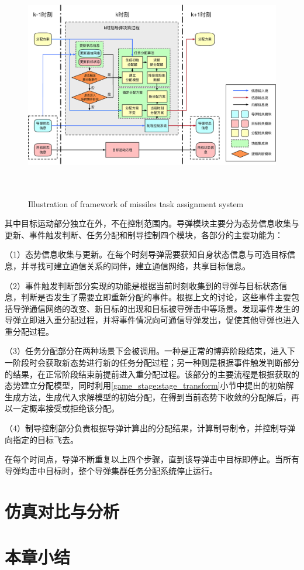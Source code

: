 \begin{figure}[!htp]
  \centering
  \includegraphics[height=10cm]{stochastic_game/framework}
  {Illustration of framework of missiles task assignment system}
  \label{fig:framework}
\end{figure}

其中目标运动部分独立在外，不在控制范围内。导弹模块主要分为态势信息收集与更新、事件触发判断、任务分配和制导控制四个模块，各部分的主要功能为：

（1）态势信息收集与更新。在每个时刻导弹需要获知自身状态信息与可选目标信息，并寻找可建立通信关系的同伴，建立通信网络，共享目标信息。

（2）事件触发判断部分实现的功能是根据当前时刻收集到的导弹与目标状态信息，判断是否发生了需要立即重新分配的事件。根据上文的讨论，这些事件主要包括导弹通信网络的改变、新目标的出现和目标被导弹击中等场景。发现事件发生的导弹立即进入重分配过程，并将事件情况向可通信导弹发出，促使其他导弹也进入重分配过程。

（3）任务分配部分在两种场景下会被调用。一种是正常的博弈阶段结束，进入下一阶段时会获取新态势进行新的任务分配过程；另一种则是根据事件触发判断部分的结果，在正常阶段结束前提前进入重分配过程。该部分的主要流程是根据获取的态势建立分配模型，同时利用\ref{game_stage:stage_transform}小节中提出的初始解生成方法，生成代入求解模型的初始分配，在得到当前态势下收敛的分配解后，再以一定概率接受或拒绝该分配。

（4）制导控制部分负责根据导弹计算出的分配结果，计算制导制令，并控制导弹向指定的目标飞去。

在每个时间点，导弹不断重复以上四个步骤，直到该导弹击中目标即停止。当所有导弹均击中目标时，整个导弹集群任务分配系统停止运行。

\section{仿真对比与分析}

\section{本章小结}
\label{reassign:sec:conclusion}

